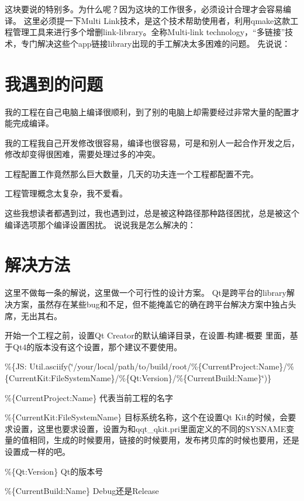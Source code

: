 这块要说的特别多。为什么呢？因为这块的工作很多，必须设计合理才会容易编译。 这里必须提一下\+Multi Link技术，是这个技术帮助使用者，利用qmake这款工程管理工具来进行多个增删link-\/library。全称\+Multi-\/link technology，“多链接”技术，专门解决这些个app链接library出现的手工解决太多困难的问题。 先说说：

\section*{我遇到的问题}


\begin{DoxyEnumerate}
\item 我的工程在自己电脑上编译很顺利，到了别的电脑上却需要经过非常大量的配置才能完成编译。
\item 我的工程我自己开发修改很容易，编译也很容易，可是和别人一起合作开发之后，修改却变得很困难，需要处理过多的冲突。
\item 工程配置工作竟然那么巨大数量，几天的功夫连一个工程都配置不完。
\item 工程管理概念太复杂，我不爱看。
\end{DoxyEnumerate}

这些我想读者都遇到过，我也遇到过，总是被这种路径那种路径困扰，总是被这个编译选项那个编译设置困扰。 说说我是怎么解决的： \section*{解决方法}

这里不做每一条的解说，这里做一个可行性的设计方案。 Qt是跨平台的library解决方案，虽然存在某些bug和不足，但不能掩盖它的确在跨平台解决方案中独占头席，无出其右。


\begin{DoxyItemize}
\item 开始一个工程之前，设置\+Qt Creator的默认编译目录，在设置-\/构建-\/概要 里面，基于\+Qt4的版本没有这个设置，那个建议不要使用。
\begin{DoxyItemize}
\item \%\{JS\+: Util.\+asciify(\char`\"{}/your/local/path/to/build/root/\%\{\+Current\+Project\+:\+Name\}/\%\{\+Current\+Kit\+:\+File\+System\+Name\}/\%\{\+Qt\+:\+Version\}/\%\{\+Current\+Build\+:\+Name\}\char`\"{})\}
\item \%\{Current\+Project\+:Name\} 代表当前工程的名字
\item \%\{Current\+Kit\+:File\+System\+Name\} 目标系统名称，这个在设置\+Qt Kit的时候，会要求设置，这里也要求设置，设置为和qqt\+\_\+qkit.\+pri里面定义的不同的\+S\+Y\+S\+N\+A\+M\+E变量的值相同，生成的时候要用，链接的时候要用，发布拷贝库的时候也要用，还是设置成一样的吧。
\item \%\{Qt\+:Version\} Qt的版本号
\item \%\{Current\+Build\+:Name\} Debug还是\+Release
\end{DoxyItemize}
\end{DoxyItemize}

